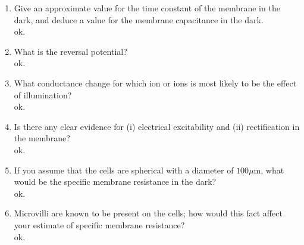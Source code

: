 \documentclass[11pt]{article}
\begin{document}
\begin{enumerate}[label=\arabic*.]
\begin{enumerate}[label=(\alph*)]
\item
Give an approximate value for the time constant  of the membrane in the dark, and deduce a value for the membrane capacitance in the dark.
\vspace*{1\baselineskip}
\\
ok.












\item
What is the reversal potential?
\vspace*{1\baselineskip}
\\
ok.











\item
What conductance change for which ion or ions is most likely to be the effect of illumination?
\vspace*{1\baselineskip}
\\
ok.












\item
Is there any clear evidence for (i) electrical excitability and (ii) rectification in the membrane?
\vspace*{1\baselineskip}
\\
ok.












\item
If you assume that the cells are spherical with a diameter of $100 \mu\text{m}$, what would be the specific membrane resistance in the dark?
\vspace*{1\baselineskip}
\\
ok.












\item
Microvilli are known to be present on the cells; how would this fact affect your estimate of specific membrane resistance?
\vspace*{1\baselineskip}
\\
ok.















\end{enumerate}
\end{enumerate}
\end{document}
